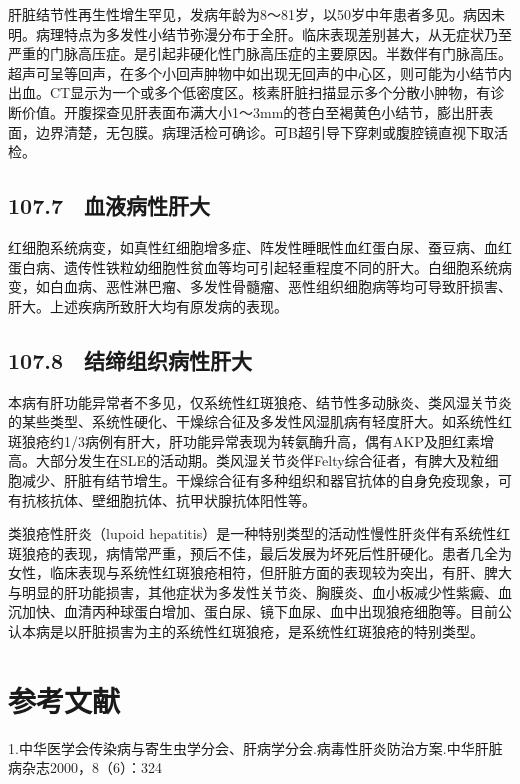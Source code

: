 肝脏结节性再生性增生罕见，发病年龄为8～81岁，以50岁中年患者多见。病因未明。病理特点为多发性小结节弥漫分布于全肝。临床表现差别甚大，从无症状乃至严重的门脉高压症。是引起非硬化性门脉高压症的主要原因。半数伴有门脉高压。超声可呈等回声，在多个小回声肿物中如出现无回声的中心区，则可能为小结节内出血。CT显示为一个或多个低密度区。核素肝脏扫描显示多个分散小肿物，有诊断价值。开腹探查见肝表面布满大小1～3mm的苍白至褐黄色小结节，膨出肝表面，边界清楚，无包膜。病理活检可确诊。可B超引导下穿刺或腹腔镜直视下取活检。

\subsection{107.7　血液病性肝大}

红细胞系统病变，如真性红细胞增多症、阵发性睡眠性血红蛋白尿、蚕豆病、血红蛋白病、遗传性铁粒幼细胞性贫血等均可引起轻重程度不同的肝大。白细胞系统病变，如白血病、恶性淋巴瘤、多发性骨髓瘤、恶性组织细胞病等均可导致肝损害、肝大。上述疾病所致肝大均有原发病的表现。

\subsection{107.8　结缔组织病性肝大}

本病有肝功能异常者不多见，仅系统性红斑狼疮、结节性多动脉炎、类风湿关节炎的某些类型、系统性硬化、干燥综合征及多发性风湿肌病有轻度肝大。如系统性红斑狼疮约1/3病例有肝大，肝功能异常表现为转氨酶升高，偶有AKP及胆红素增高。大部分发生在SLE的活动期。类风湿关节炎伴Felty综合征者，有脾大及粒细胞减少、肝脏有结节增生。干燥综合征有多种组织和器官抗体的自身免疫现象，可有抗核抗体、壁细胞抗体、抗甲状腺抗体阳性等。

类狼疮性肝炎（lupoid
hepatitis）是一种特别类型的活动性慢性肝炎伴有系统性红斑狼疮的表现，病情常严重，预后不佳，最后发展为坏死后性肝硬化。患者几全为女性，临床表现与系统性红斑狼疮相符，但肝脏方面的表现较为突出，有肝、脾大与明显的肝功能损害，其他症状为多发性关节炎、胸膜炎、血小板减少性紫癜、血沉加快、血清丙种球蛋白增加、蛋白尿、镜下血尿、血中出现狼疮细胞等。目前公认本病是以肝脏损害为主的系统性红斑狼疮，是系统性红斑狼疮的特别类型。

\protect\hypertarget{text00243.html}{}{}

\section{参考文献}

1.中华医学会传染病与寄生虫学分会、肝病学分会.病毒性肝炎防治方案.中华肝脏病杂志2000，8（6）：324

